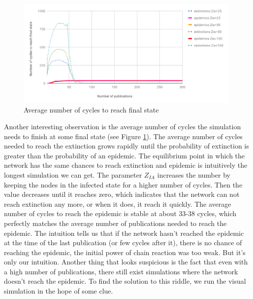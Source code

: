 \documentclass[nostrict]{szablonPG}
\begin{document}
\begin{figure}[h!]
    \includegraphics[width=11cm]{img/average-number-of-cycles-to-reach-final-state.png}
    \centering
    \caption{Average number of cycles to reach final state}
    \label{fig:average-number-of-cycles}
\end{figure}
Another interesting observation is the average number of cycles the simulation needs to finish at some final state (see Figure \ref{fig:average-number-of-cycles}). The average number of cycles needed to reach the extinction grows rapidly until the probability of extinction is greater than the probability of an epidemic. The equilibrium point in which the network has the same chances to reach extinction and epidemic is intuitively the longest simulation we can get. The parameter $Z_{IA}$ increases the number by keeping the nodes in the infected state for a higher number of cycles. Then the value decreases until it reaches zero, which indicates that the network can not reach extinction any more, or when it does, it reach it quickly.
The average number of cycles to reach the epidemic is stable at about 33-38 cycles, which perfectly matches the average number of publications needed to reach the epidemic. The intuition tells us that if the network hasn't reached the epidemic at the time of the last publication (or few cycles after it), there is no chance of reaching the epidemic, the initial power of chain reaction was too weak. But it's only our intuition. Another thing that looks suspicious is the fact that even with a high number of publications, there still exist simulations where the network doesn't reach the epidemic. To find the solution to this riddle, we run the visual simulation in the hope of some clue.
\end{document}
